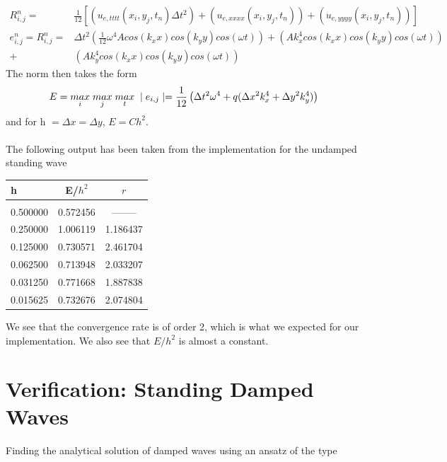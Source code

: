\documentclass[twoside]{article}
\begin{document}
\begin{align*}
R_{i,j}^{n} =& \frac{1}{12}\left[\left(u_{e,tttt}(x_{i},y_{j},t_{n})\Delta t^{2}\right)+\left(u_{e,xxxx}(x_{i},y_{j},t_{n})\right)+\left(u_{e,yyyy}(x_{i},y_{j},t_{n})\right)\right]\\
e_{i,j}^{n} = R_{i,j}^{n} =&\Delta t^{2}\left(\frac{1}{12}\omega^{4}Acos(k_{x}x)cos(k_{y}y)cos(\omega t)\right)+\left(Ak_{x}^{4}cos(k_{x}x)cos(k_{y}y)cos(\omega t)\right) \\
+&\left(Ak_{y}^{4}cos(k_{x}x)cos(k_{y}y)cos(\omega t)\right)
\end{align*}
The norm then takes the form
\[
E=\underset{i}{max}\hspace{1mm}\underset{j}{max}\hspace{1mm}\underset{t}{max}\hspace{1mm}\mid e_{i,j}\mid=\frac{1}{12}\left(\Delta t^{2}\omega^{4}+q(\Delta x^{2}k_{x}^{4}+\Delta y^{2}k_{y}^{4})\right)
\]
and for h  $= \Delta x = \Delta y$, $E = Ch^{2}$.
\\ \\
The following output has been taken from the implementation for the undamped standing wave

\begin{center}
\begin{tabular}{ l | c|c }
h & E/$h^2$& $r$ \\
\hline
&  \\
0.500000 & 0.572456 & --------\\
0.250000 & 1.006119 & 1.186437\\
0.125000 & 0.730571 & 2.461704\\
0.062500 & 0.713948 & 2.033207\\
0.031250 & 0.771668 & 1.887838\\
0.015625 & 0.732676 & 2.074804\\
\end{tabular}
\end{center}
We see that the convergence rate is of order 2, which is what we expected for our implementation. We also see that $E/h^2$ is almost a constant.

\section{Verification: Standing Damped Waves}

Finding the analytical solution of damped waves using an ansatz of the type
\end{document}
